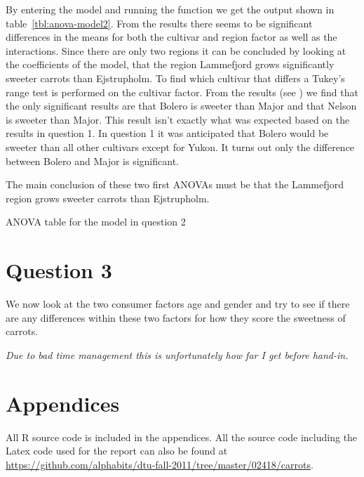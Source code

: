By entering the model  and running the  function we get the output shown in table~\ref{tbl:anova-model2}. From the results there seems to be significant differences in the means for both the cultivar and region factor as well as the interactions. Since there are only two regions it can be concluded by looking at the coefficients of the model, that the region Lammefjord grows significantly sweeter carrots than Ejstrupholm. To find which cultivar that differs a Tukey's range test is performed on the cultivar factor. From the results (see ) we find that the only significant results are that Bolero is sweeter than Major and that Nelson is sweeter than Major. This result isn't exactly what was expected based on the results in question 1. In question 1 it was anticipated that Bolero would be sweeter than all other cultivars except for Yukon. It turns out only the difference between Bolero and Major is significant. \par
The main conclusion of these two first ANOVAs must be that the Lammefjord region grows sweeter carrots than Ejstrupholm.

\begin{table}
    \centering
    
    \caption{ANOVA table for the model in question 2}\label{tbl:anova-model2}
\end{table}

\section{Question 3}
We now look at the two consumer factors age and gender and try to see if there are any differences within these two factors for how they score the sweetness of carrots.

\textit{Due to bad time management this is unfortunately how far I get before hand-in.}

\pagebreak

\renewcommand\thesection{\Alph{section}}
\section{Appendices}
All R source code is included in the appendices. All the source code including the Latex code used for the report can also be found at \url{https://github.com/alphabits/dtu-fall-2011/tree/master/02418/carrots}.

